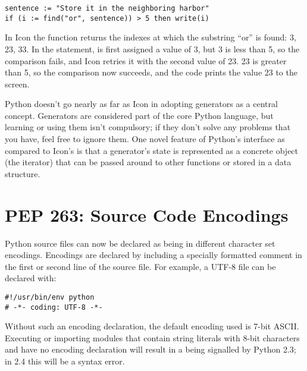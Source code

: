 \documentclass{howto}
\begin{document}
\begin{verbatim}
sentence := "Store it in the neighboring harbor"
if (i := find("or", sentence)) > 5 then write(i)
\end{verbatim}

In Icon the  function returns the indexes at which the
substring ``or'' is found: 3, 23, 33.  In the  statement,
 is first assigned a value of 3, but 3 is less than 5, so the
comparison fails, and Icon retries it with the second value of 23.  23
is greater than 5, so the comparison now succeeds, and the code prints
the value 23 to the screen.

Python doesn't go nearly as far as Icon in adopting generators as a
central concept.  Generators are considered part of the core
Python language, but learning or using them isn't compulsory; if they
don't solve any problems that you have, feel free to ignore them.
One novel feature of Python's interface as compared to
Icon's is that a generator's state is represented as a concrete object
(the iterator) that can be passed around to other functions or stored
in a data structure.

\begin{seealso}


\end{seealso}


\section{PEP 263: Source Code Encodings \label{section-encodings}}

Python source files can now be declared as being in different
character set encodings.  Encodings are declared by including a
specially formatted comment in the first or second line of the source
file.  For example, a UTF-8 file can be declared with:

\begin{verbatim}
#!/usr/bin/env python
# -*- coding: UTF-8 -*-
\end{verbatim}

Without such an encoding declaration, the default encoding used is
7-bit ASCII.  Executing or importing modules that contain string
literals with 8-bit characters and have no encoding declaration will result
in a  being signalled by Python 2.3; in
2.4 this will be a syntax error.
\end{document}
